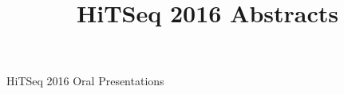 \documentclass[11pt]{article}
\date{}
\author{}
\title{
  HiTSeq 2016 Abstracts
}
\begin{document}

\begin{center}

\vspace*{5cm}
\Huge{HiTSeq 2016 Oral Presentations}
\end{center}

\newpage


  \clearpage 
  \clearpage 
  \clearpage 
  \clearpage 
\end{document}
